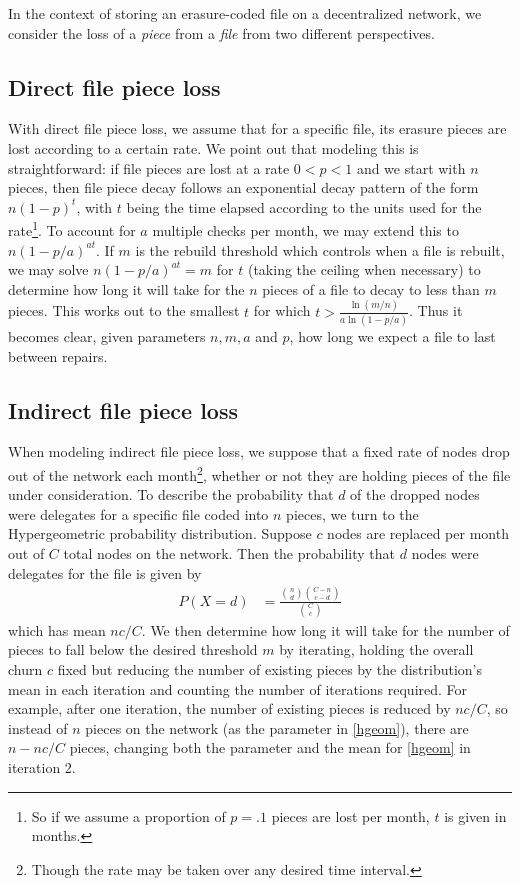 In the context of storing an erasure-coded file on a decentralized network, we consider the loss of a {\em piece} from a {\em file} from two different perspectives.

\subsection{Direct file piece loss}
With direct file piece loss, we assume that for a specific file, its erasure pieces are lost according to a certain rate. We point out that modeling this is straightforward: if file pieces are lost at a rate $0<p<1$ and we start with $n$ pieces, then file piece decay follows an exponential decay pattern of the form $n(1-p)^t$, with $t$ being the time elapsed according to the units used for the rate\footnote{So if we assume a proportion of $p=.1$ pieces are lost per month, $t$ is given in months.}.
To account for $a$ multiple checks per month, we may extend this to $n(1-p/a)^{at}$. If $m$ is the rebuild threshold which controls when a file is rebuilt, we may solve $n(1-p/a)^{at}=m$ for $t$ (taking the ceiling when necessary) to determine how long it will take for the $n$ pieces of a file to decay to less than $m$ pieces. This works out to the smallest $t$ for which
$t>\frac{\ln(m/n)}{a\ln(1-p/a)}$. Thus it becomes clear, given parameters $n,m,a$ and $p$, how long we expect a file to last between repairs.

\subsection{Indirect file piece loss}

When modeling indirect file piece loss, we suppose that a fixed rate of nodes
drop out of the network each month\footnote{Though the rate may be taken over
any desired time interval.}, whether or not they are holding pieces of the file
under consideration. To describe the probability that $d$ of the dropped nodes
were delegates for a specific file coded into $n$ pieces, we turn to the
Hypergeometric probability distribution. Suppose $c$ nodes are replaced per
month out of $C$ total nodes on the network. Then the probability that $d$
nodes were delegates for the file is given by
\begin{align}
&&    P(X=d)&=\frac{\binom{n}{d}\binom{C-n}{c-d}}{\binom{C}{c}}\label{hgeom} &&
\end{align}
which has mean $nc/C$. We then determine how long it will take for the number of pieces to fall below the desired threshold $m$ by iterating, holding the overall churn $c$ fixed but reducing the number of existing pieces by the distribution's mean in each iteration and counting the number of iterations required. For example, after one iteration, the number of existing pieces is reduced by $nc/C$, so instead of $n$ pieces on the network (as the parameter in \eqref{hgeom}), there are $n-nc/C$ pieces, changing both the parameter and the mean for \eqref{hgeom} in iteration 2.

